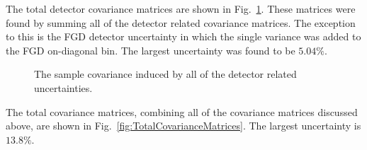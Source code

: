 \newline
\newline
The total detector covariance matrices are shown in Fig.~\ref{fig:DetectorCovarianceMatrices}.  These matrices were found by summing all of the detector related covariance matrices.  The exception to this is the FGD detector uncertainty in which the single variance was added to the FGD on-diagonal bin.  The largest uncertainty was found to be $5.04\%$.
\begin{figure}%
  \centering
  \caption{The sample covariance induced by all of the detector related uncertainties.}
  \label{fig:DetectorCovarianceMatrices}
\end{figure}
The total covariance matrices, combining all of the covariance matrices discussed above, are shown in Fig.~\ref{fig:TotalCovarianceMatrices}.  The largest uncertainty is $13.8\%$.
